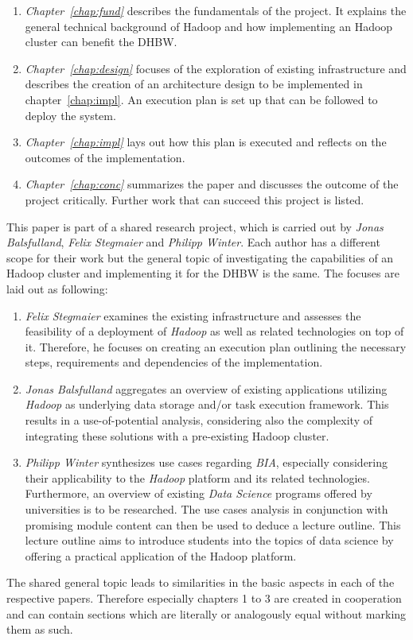 \begin{enumerate}
    \item \emph{Chapter~\ref{chap:fund}} describes the fundamentals of the project. 
        It explains the general technical background of Hadoop 
        and how implementing an Hadoop cluster can benefit the \ac{DHBW}. 
    \item \emph{Chapter~\ref{chap:design}} focuses of the exploration of existing
        infrastructure and describes the creation of an architecture design 
        to be implemented in chapter~\ref{chap:impl}. 
        An execution plan is set up that can be followed to deploy the system.
    \item \emph{Chapter~\ref{chap:impl}} lays out how this plan is executed 
        and reflects on the outcomes of the implementation. 
    \item \emph{Chapter~\ref{chap:conc}} summarizes the paper 
        and discusses the outcome of the project critically.
        Further work that can succeed this project is listed.
\end{enumerate}

This paper is part of a shared research project,
which is carried out by \emph{Jonas Balsfulland}, \emph{Felix Stegmaier} and \emph{Philipp Winter}.
Each author has a different scope for their work 
but the general topic of investigating the capabilities of an Hadoop cluster 
and implementing it for the \ac{DHBW} is the same.
The focuses are laid out as following:

\begin{enumerate}
	\item \emph{Felix Stegmaier} examines the existing infrastructure and assesses the feasibility of a deployment of \emph{Hadoop} as well as related technologies on top of it. Therefore, he focuses on creating an execution plan outlining the necessary steps, requirements and dependencies of the implementation.
	\item \emph{Jonas Balsfulland} aggregates an overview of existing applications utilizing \emph{Hadoop} as underlying data storage and/or task execution framework. This results in a use-of-potential analysis, considering also the complexity of integrating these solutions with a pre-existing Hadoop cluster.
	\item \emph{Philipp Winter} synthesizes use cases regarding \emph{\ac{BIA}}, especially considering their applicability to the \emph{Hadoop} platform and its related technologies. Furthermore, an overview of existing \emph{Data Science} programs offered by universities is to be researched. The use cases analysis in conjunction with promising module content can then be used to deduce a lecture outline. This lecture outline aims to introduce students into the topics of data science by offering a practical application of the Hadoop platform.
\end{enumerate}

The shared general topic leads to similarities in the basic aspects in each of the respective papers.
Therefore especially chapters 1 to 3 are created in cooperation 
and can contain sections which are literally or analogously equal without marking them as such.

